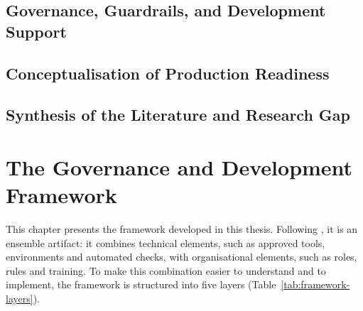 \documentclass[10pt,a4paper]{article}
\begin{document}
\subsection{Governance, Guardrails, and Development Support}

\subsection{Conceptualisation of Production Readiness}

\subsection{Synthesis of the Literature and Research Gap}

\section{The Governance and Development Framework}
\label{sec:framework}

This chapter presents the framework developed in this thesis. Following
\textcite{sein2011adr}, it is an ensemble artifact: it combines technical
elements, such as approved tools, environments and automated checks, with
organisational elements, such as roles, rules and training. To make this
combination easier to understand and to implement, the framework is
structured into five layers (Table~\ref{tab:framework-layers}).
\end{document}
